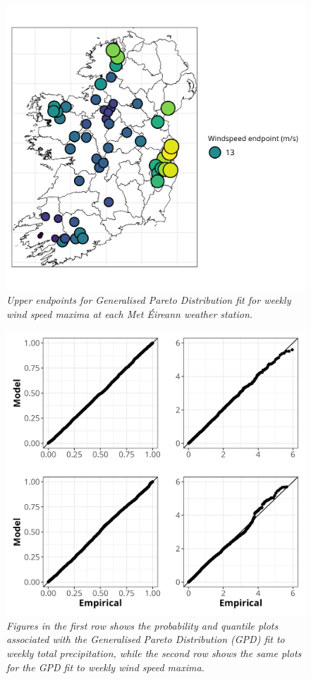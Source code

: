 \documentclass{article}
\numberwithin{equation}{section}
\begin{document}
\begin{figure}[H]
    \centering
    \includegraphics[width = 0.9\linewidth]{plots/034_ws_endpoint.png}
    \caption{\emph{Upper endpoints for Generalised Pareto Distribution fit for weekly wind speed maxima at each Met Éireann weather station.}}
    \label{fig:03_ws_endpoint}
\end{figure}


\begin{figure}[H]
    \centering
    \includegraphics[width = 0.9\linewidth]{plots/035_pp_qq.png}
    \caption{\emph{Figures in the first row shows the probability and quantile plots associated with the Generalised Pareto Distribution (GPD) fit to weekly total precipitation, while the second row shows the same plots for the GPD fit to weekly wind speed maxima.}}
    \label{fig:03_pp_qq}
\end{figure}
\end{document}
